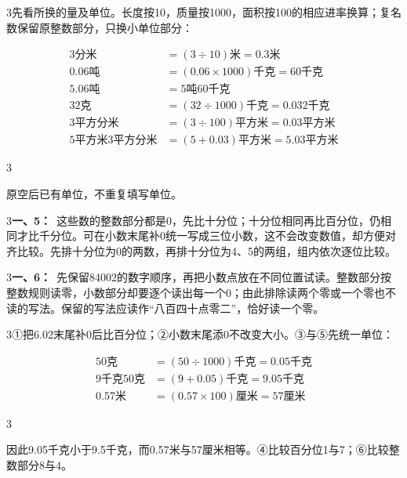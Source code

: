 \documentclass[multi=snippet,border={5bp 20bp 5bp 5bp}]{standalone}
\newenvironment{snippet}[3]{\begin{minipage}{#1bp}\color{answerred}\fontsize{#2}{#3}\selectfont\raggedright}{\end{minipage}}
\begin{document}
\begin{snippet}{505}{11.5}{14}\begin{multicols}{3}\raggedcolumns 先看所换的量及单位。长度按10，质量按1000，面积按100的相应进率换算；复名数保留原整数部分，只换小单位部分：\par\noindent\end{multicols}\[\displaystyle \begin{aligned}3\text{分米}&=(3\div10)\text{米}=0.3\text{米}\\0.06\text{吨}&=(0.06\times1000)\text{千克}=60\text{千克}\\5.06\text{吨}&=5\text{吨}60\text{千克}\\32\text{克}&=(32\div1000)\text{千克}=0.032\text{千克}\\3\text{平方分米}&=(3\div100)\text{平方米}=0.03\text{平方米}\\5\text{平方米}3\text{平方分米}&=(5+0.03)\text{平方米}=5.03\text{平方米}\end{aligned}\]\begin{multicols}{3}\raggedcolumns \par 原空后已有单位，不重复填写单位。\end{multicols}\end{snippet}
\begin{snippet}{505}{11.5}{14}\begin{multicols}{3}\raggedcolumns \textbf{一、5：}\ 这些数的整数部分都是0，先比十分位；十分位相同再比百分位，仍相同才比千分位。可在小数末尾补0统一写成三位小数，这不会改变数值，却方便对齐比较。先排十分位为0的两数，再排十分位为4、5的两组，组内依次逐位比较。\end{multicols}\end{snippet}
\begin{snippet}{505}{11.5}{14}\begin{multicols}{3}\raggedcolumns \textbf{一、6：}\ 先保留84002的数字顺序，再把小数点放在不同位置试读。整数部分按整数规则读零，小数部分却要逐个读出每一个0；由此排除读两个零或一个零也不读的写法。保留的写法应读作“八百四十点零二”，恰好读一个零。\end{multicols}\end{snippet}
\begin{snippet}{505}{11.5}{14}\begin{multicols}{3}\raggedcolumns ①把6.02末尾补0后比百分位；②小数末尾添0不改变大小。③与⑤先统一单位：\par\noindent\end{multicols}\[\displaystyle \begin{aligned}50\text{克}&=(50\div1000)\text{千克}=0.05\text{千克}\\9\text{千克}50\text{克}&=(9+0.05)\text{千克}=9.05\text{千克}\\0.57\text{米}&=(0.57\times100)\text{厘米}=57\text{厘米}\end{aligned}\]\begin{multicols}{3}\raggedcolumns \par 因此9.05千克小于9.5千克，而0.57米与57厘米相等。④比较百分位1与7；⑥比较整数部分8与4。\end{multicols}\end{snippet}
\end{document}
